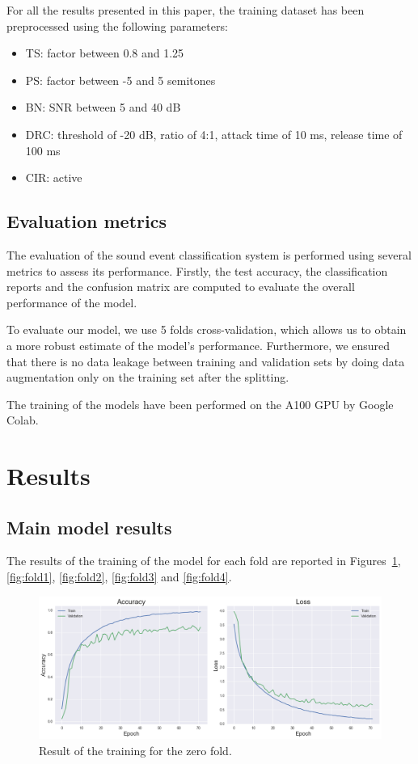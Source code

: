 \documentclass{article}
\begin{document}
\begin{sloppy}
For all the results presented in this paper, the training dataset has been preprocessed using the following parameters:
\begin{itemize}
    \item TS: factor between 0.8 and 1.25
    \item PS: factor between -5 and 5 semitones
    \item BN: SNR between 5 and 40 dB
    \item DRC: threshold of -20 dB, ratio of 4:1, attack time of 10 ms, release time of 100 ms
    \item CIR: active
\end{itemize}


\subsection{Evaluation metrics}
\label{sec:metrics}
The evaluation of the sound event classification system is performed using several metrics to assess its performance.
Firstly, the test accuracy, the classification reports and the confusion matrix are computed to evaluate the overall performance of the model.

To evaluate our model, we use 5 folds cross-validation, which allows us to obtain a more robust estimate of the model's performance.
Furthermore, we ensured that there is no data leakage between training and validation sets by doing data augmentation only on the
training set after the splitting.

The training of the models have been performed on the A100 GPU by Google Colab.



\section{Results}
\label{sec:results}
\subsection{Main model results}
\label{sec:main_model_results}
The results of the training of the model for each fold are reported in Figures~\ref{fig:fold0}, \ref{fig:fold1}, \ref{fig:fold2}, \ref{fig:fold3} and \ref{fig:fold4}.
\begin{figure}[ht]
  \centering
  \centerline{\includegraphics[width=\columnwidth]{fold0.png}}
  \caption{Result of the training for the zero fold.}
  \label{fig:fold0}
\end{figure}


\end{sloppy}
\end{document}
